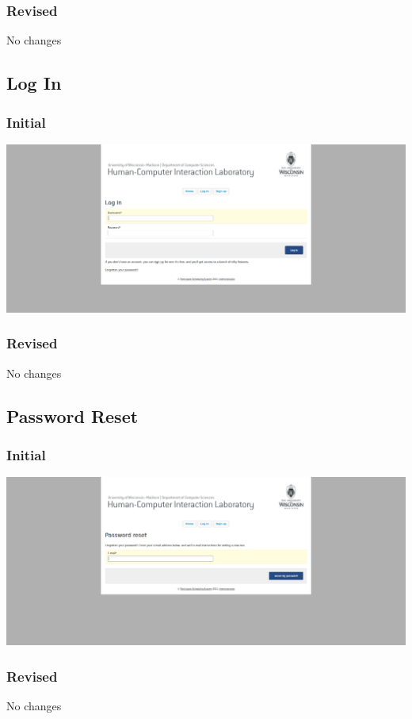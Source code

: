 \subsubsection{Revised}
No changes

\subsection{Log In}
\subsubsection{Initial}
\includegraphics[width=6in]{../other/initial-interface-design/log-in.png}
\subsubsection{Revised}
No changes

\subsection{Password Reset}
\subsubsection{Initial}
\includegraphics[width=6in]{../other/initial-interface-design/password-reset.png}
\subsubsection{Revised}
No changes

